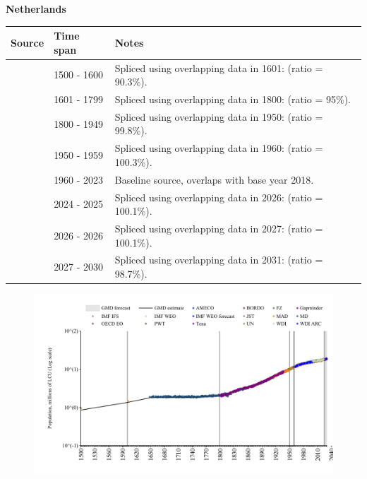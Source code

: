 \documentclass[12pt,a4paper,landscape]{article}
\begin{document}
\begin{adjustbox}{max totalsize={\paperwidth}{\paperheight},center}
\begin{minipage}[t][\textheight][t]{\textwidth}
\vspace*{0.5cm}
{}
\begin{center}
{\Large\bfseries Netherlands}
\end{center}
\vspace{0.5cm}
\begin{table}[H]
\centering
\small
\begin{tabular}{|l|l|l|}
\hline
\textbf{Source} & \textbf{Time span} & \textbf{Notes} \\
\hline
\rowcolor{white}\cite{MAD}& 1500 - 1600 &Spliced using overlapping data in 1601: (ratio = 90.3\%).\\
\rowcolor{lightgray}\cite{MD}& 1601 - 1799 &Spliced using overlapping data in 1800: (ratio = 95\%).\\
\rowcolor{white}\cite{Gapminder}& 1800 - 1949 &Spliced using overlapping data in 1950: (ratio = 99.8\%).\\
\rowcolor{lightgray}\cite{IMF_IFS}& 1950 - 1959 &Spliced using overlapping data in 1960: (ratio = 100.3\%).\\
\rowcolor{white}\cite{WDI}& 1960 - 2023 &Baseline source, overlaps with base year 2018.\\
\rowcolor{lightgray}\cite{OECD_EO}& 2024 - 2025 &Spliced using overlapping data in 2026: (ratio = 100.1\%).\\
\rowcolor{white}\cite{AMECO}& 2026 - 2026 &Spliced using overlapping data in 2027: (ratio = 100.1\%).\\
\rowcolor{lightgray}\cite{Gapminder}& 2027 - 2030 &Spliced using overlapping data in 2031: (ratio = 98.7\%).\\
\hline
\end{tabular}
\end{table}
\begin{figure}[H]
\centering
\includegraphics[width=\textwidth,height=0.6\textheight,keepaspectratio]{graphs/NLD_pop.pdf}
\end{figure}
\end{minipage}
\end{adjustbox}
\end{document}
